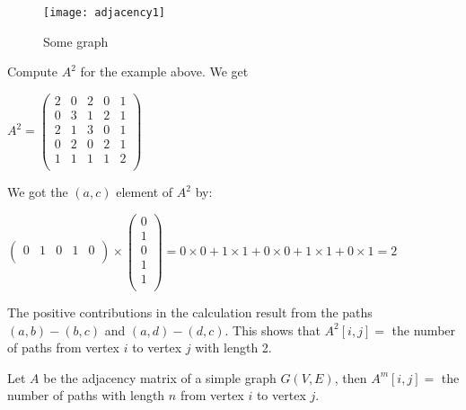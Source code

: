 \begin{figure}[ht]
	\centering
	\texttt{[image: adjacency1]}
	\caption{ Some graph \label{adjacency1}}
\end{figure}

\begin{example}
Compute $A^{2}$ for the example above. We get

\begin{center}
$
A^{2} = \left(
\begin{array}{ccccc}
2 & 0 & 2 & 0 & 1\\
0 & 3 & 1 & 2 & 1\\
2 & 1 & 3 & 0 & 1\\
0 & 2 & 0 & 2 & 1\\
1 & 1 & 1 & 1 & 2\\
\end{array}
\right)
$
\end{center}

We got the $(a,c)$ element of $A^{2}$ by:

\begin{center}
$
\left(
\begin{array}{ccccc}
0 & 1 & 0 & 1 & 0\\
\end{array}
\right)
\times
\left(
\begin{array}{c}
0\\
1\\
0\\
1\\
1\\
\end{array}
\right)
 =
0\times 0 + 1\times 1 + 0\times 0 + 1\times 1 + 0\times 1 = 2$
\end{center}

The positive contributions in the calculation result from the paths
$(a,b)-(b,c)$ and $(a,d)-(d,c)$. This shows that $A^{2}[i,j] = $ the
number of paths from vertex $i$ to vertex $j$ with length 2.
\end{example}


\begin{theorem}\label{aantalpathen}
Let $A$ be the adjacency matrix of a simple graph $G(V,E)$,
then
$A^{m}[i,j] = $ the number of paths with length $n$ from vertex $i$ to vertex
$j$.
\end{theorem}

